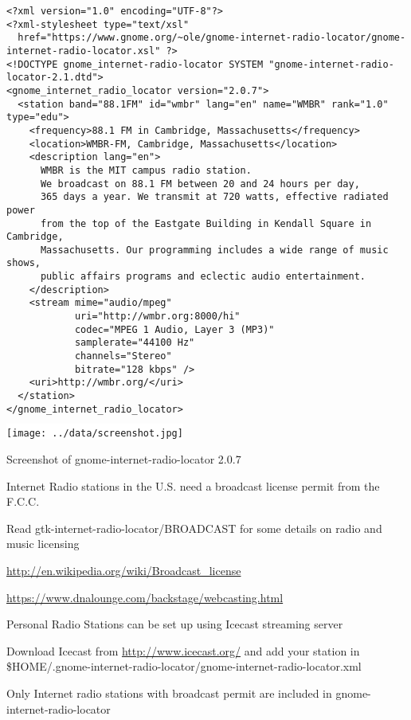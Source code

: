 \documentclass[20pt,landscape]{foils}
\begin{document}
\begin{tiny}
\begin{verbatim}
<?xml version="1.0" encoding="UTF-8"?>
<?xml-stylesheet type="text/xsl"
  href="https://www.gnome.org/~ole/gnome-internet-radio-locator/gnome-internet-radio-locator.xsl" ?>
<!DOCTYPE gnome_internet-radio-locator SYSTEM "gnome-internet-radio-locator-2.1.dtd">
<gnome_internet_radio_locator version="2.0.7">
  <station band="88.1FM" id="wmbr" lang="en" name="WMBR" rank="1.0" type="edu">
    <frequency>88.1 FM in Cambridge, Massachusetts</frequency>
    <location>WMBR-FM, Cambridge, Massachusetts</location>
    <description lang="en">
      WMBR is the MIT campus radio station.
      We broadcast on 88.1 FM between 20 and 24 hours per day, 
      365 days a year. We transmit at 720 watts, effective radiated power 
      from the top of the Eastgate Building in Kendall Square in Cambridge, 
      Massachusetts. Our programming includes a wide range of music shows, 
      public affairs programs and eclectic audio entertainment.
    </description>
    <stream mime="audio/mpeg"
            uri="http://wmbr.org:8000/hi"
            codec="MPEG 1 Audio, Layer 3 (MP3)"
            samplerate="44100 Hz"
            channels="Stereo"
            bitrate="128 kbps" />
    <uri>http://wmbr.org/</uri>
  </station>
</gnome_internet_radio_locator>
\end{verbatim}
\end{tiny}


\begin{center}

  \colorbox{white}{\texttt{[image: ../data/screenshot.jpg]}}

  {\blueem Screenshot of gnome-internet-radio-locator 2.0.7}

\end{center}


\begin{list1}
  \item Internet Radio stations in the U.S. need a broadcast license permit from the F.C.C.
    \begin{list2}
    \item Read gtk-internet-radio-locator/BROADCAST for some details on radio and music licensing
    \item \url{http://en.wikipedia.org/wiki/Broadcast_license}
    \item \url{https://www.dnalounge.com/backstage/webcasting.html}
    \end{list2}
  \item Personal Radio Stations can be set up using Icecast streaming server
    \begin{list2}
    \item Download Icecast from \url{http://www.icecast.org/} and add your station in \$HOME/.gnome-internet-radio-locator/gnome-internet-radio-locator.xml
    \end{list2}
  \item Only Internet radio stations with broadcast permit are included in gnome-internet-radio-locator
\end{list1}
\end{document}
